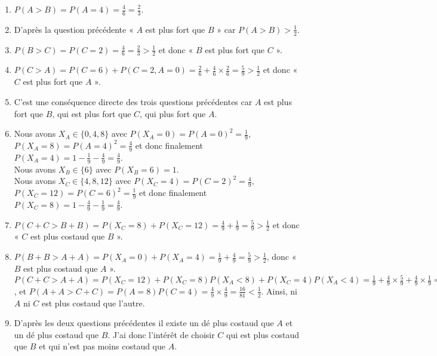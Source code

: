 \documentclass[a4paper,12pt,reqno]{amsart}
\begin{document}
\begin{solution}
  \begin{enumerate}
    \item $P(A > B) = P( A=4 ) = \frac{4}{6} = \frac{2}{3}$.
    \item D'après la question précédente « $A$ est plus fort que $B$ » car $P(A > B) > \frac{1}{2}.$
    \item $P(B > C) = P( C=2 ) = \frac{4}{6} = \frac{2}{3} > \frac{1}{2}$ et donc « $B$ est plus fort que $C$ ».
    \item $P(C > A) = P(C=6) + P(C=2,A=0) = \frac{2}{6} + \frac{4}{6} \times \frac{2}{6} = \frac{5}{9} > \frac{1}{2}$ et donc « $C$ est plus fort que $A$ ».
    \item C'est une conséquence directe des trois questions précédentes car $A$ est plus fort que $B$, qui est plus fort que $C$, qui plus fort que $A$.
    \item Nous avons $X_{A} \in \{0,4,8\}$ avec $P(X_{A}=0) = P(A=0)^{2} = \frac{1}{9}$, $P(X_{A}=8) = P(A=4)^{2} = \frac{4}{9}$ et donc finalement $P(X_{A}=4) = 1-\frac{1}{9}-\frac{4}{9} = \frac{4}{9}$.\\
    Nous avons $X_{B} \in \{6\}$ avec $P(X_{B}=6)=1$.\\
    Nous avons $X_{C} \in \{4,8,12\}$ avec $P(X_{C}=4) = P(C=2)^{2} = \frac{4}{9}$, $P(X_{C}=12) = P(C=6)^{2} = \frac{1}{9}$ et donc finalement $P(X_{C}=8) = 1-\frac{4}{9}-\frac{1}{9} = \frac{4}{9}$.
    \item $P(C+C > B+B) = P(X_{C}=8) + P(X_{C}=12) = \frac{4}{9} + \frac{1}{9} = \frac{5}{9} > \frac{1}{2}$ et donc « $C$ est plus costaud que $B$ ».
    \item $P(B+B > A+A) = P(X_{A}=0) + P(X_{A}=4) = \frac{1}{9} + \frac{4}{9} = \frac{5}{9} > \frac{1}{2}$, donc « $B$ est plus costaud que $A$ ».\\
    $P(C+C > A+A) = P(X_{C}=12) + P(X_{C}=8)P(X_{A} < 8) + P(X_{C}=4)P(X_{A} < 4) = \frac{1}{9} + \frac{4}{9}\times\frac{5}{9} + \frac{4}{9}\times\frac{1}{9} = \frac{34}{81} < \frac{1}{2}$, et $P(A+A > C+C) = P(A = 8)P(C=4) = \frac{4}{9}\times\frac{4}{9} = \frac{16}{81} < \frac{1}{2}$. Ainsi, ni $A$ ni $C$ est plus costaud que l'autre.
    \item D'après les deux questions précédentes il existe un dé plus costaud que $A$ et un dé plus costaud que $B$. J'ai donc l'intérêt de choisir $C$ qui est plus costaud que $B$ et qui n'est pas moins costaud que $A$.
  \end{enumerate}

\end{solution}
\end{document}
